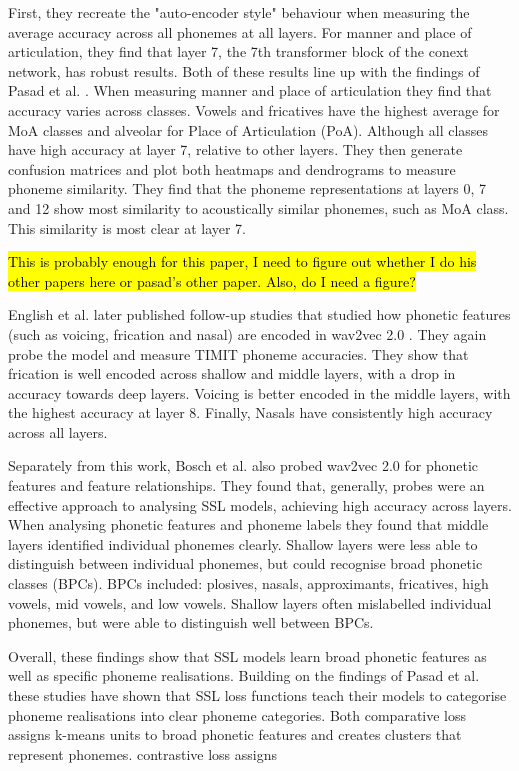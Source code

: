 First, they recreate the "auto-encoder style" behaviour when measuring the average accuracy across all phonemes at all layers. For manner and place of articulation, they find that layer 7, the 7th transformer block of the conext network, has robust results. Both of these results line up with the findings of Pasad et al. \cite{pasad2021layer}. When measuring manner and place of articulation they find that accuracy varies across classes. Vowels and fricatives have the highest average for MoA classes and alveolar for Place of Articulation (PoA). Although all classes have high accuracy at layer 7, relative to other layers. They then generate confusion matrices and plot both heatmaps and dendrograms to measure phoneme similarity. They find that the phoneme representations at layers 0, 7 and 12 show most similarity to acoustically similar phonemes, such as MoA class. This similarity is most clear at layer 7.

\hl{This is probably enough for this paper, I need to figure out whether I do his other papers here or pasad's other paper. Also, do I need a figure?}

English et al. \cite{english2023discovering} later published follow-up studies that studied how phonetic features (such as voicing, frication and nasal) are encoded in wav2vec 2.0 \cite{wav2vec}. They again probe the model and measure TIMIT phoneme accuracies. They show that frication is well encoded across shallow and middle layers, with a drop in accuracy towards deep layers. Voicing is better encoded in the middle layers, with the highest accuracy at layer 8. Finally, Nasals have consistently high accuracy across all layers. 

Separately from this work, Bosch et al. \cite{ten2023phonemic} also probed wav2vec 2.0 for phonetic features and feature relationships. They found that, generally, probes were an effective approach to analysing SSL models, achieving high accuracy across layers. When analysing phonetic features and phoneme labels they found that middle layers identified individual phonemes clearly. Shallow layers were less able to distinguish between individual phonemes, but could recognise broad phonetic classes (BPCs). BPCs included: plosives, nasals, approximants, fricatives, high vowels, mid vowels, and low vowels. Shallow layers often mislabelled individual phonemes, but were able to distinguish well between BPCs.


Overall, these findings show that SSL models learn broad phonetic features as well as specific phoneme realisations. Building on the findings of Pasad et al. \cite{pasad2021layer, pasad2023comparative} these studies have shown that SSL loss functions teach their models to categorise phoneme realisations into clear phoneme categories. Both comparative loss assigns k-means units to broad phonetic features and creates clusters that represent phonemes.  contrastive loss assigns  


